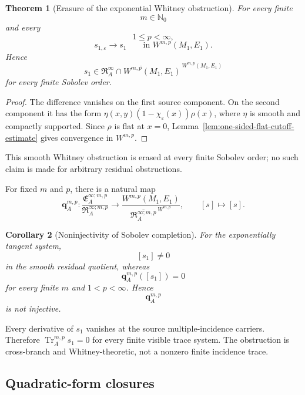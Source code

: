 \documentclass[11pt]{article}
\theoremstyle{plain}
\newtheorem{theorem}{Theorem}[section]
\newtheorem{corollary}[theorem]{Corollary}
\theoremstyle{definition}
\begin{document}
\begin{theorem}[Erasure of the exponential Whitney obstruction]
\label{thm:exponential-sobolev-erasure}
For every finite
\[
  m\in\mathbb N_0
\]
and every
\[
  1\leq p<\infty,
\]
\[
  s_{1,\varepsilon}
  \longrightarrow
  s_1
  \qquad
  \text{in }W^{m,p}(M_1,E_1).
\]
Hence
\[
  \boxed{
  s_1
  \in
  \overline{
    \mathfrak R_A^\infty
    \cap
    W^{m,p}(M_1,E_1)
  }^{\,W^{m,p}(M_1,E_1)}
  }
\]
for every finite Sobolev order.
\end{theorem}

\begin{proof}
The difference vanishes on the first source component. On the second
component it has the form
\(\eta(x,y) \left( 1-\chi_\varepsilon(x) \right) \rho(x)\),
where \(\eta\) is smooth and compactly supported. Since \(\rho\) is
flat at \(x=0\),
Lemma~\ref{lem:one-sided-flat-cutoff-estimate}
gives convergence in \(W^{m,p}\).
\end{proof}

This smooth Whitney obstruction is erased at every finite Sobolev order; no such claim is made for arbitrary residual obstructions.

For fixed \(m\) and \(p\), there is a natural map
\[
  \mathbf q_A^{m,p}:
  \frac{
    \mathfrak E_A^{\infty;m,p}
  }{
    \mathfrak R_A^{\infty;m,p}
  }
  \longrightarrow
  \frac{
    W^{m,p}(M_1,E_1)
  }{
    \overline{
      \mathfrak R_A^{\infty;m,p}
    }^{\,W^{m,p}}
  },
  \qquad
  [s]\longmapsto[s].
\]

\begin{corollary}[Noninjectivity of Sobolev completion]
\label{cor:noninjective-sobolev-completion}
For the exponentially tangent system,
\[
  [s_1]\neq0
\]
in the smooth residual quotient, whereas
\[
  \mathbf q_A^{m,p}([s_1])=0
\]
for every finite \(m\) and \(1<p<\infty\). Hence
\[
  \mathbf q_A^{m,p}
\]
is not injective.
\end{corollary}

Every derivative of \(s_1\) vanishes at the source
multiple-incidence carriers. Therefore \(\operatorname{Tr}_A^{m,p}s_1=0\) for every finite visible trace system. The obstruction is
cross-branch and Whitney-theoretic, not a nonzero finite incidence
trace.

\subsection{Quadratic-form closures}
\label{subsec:quadratic-form-closures}
\end{document}
